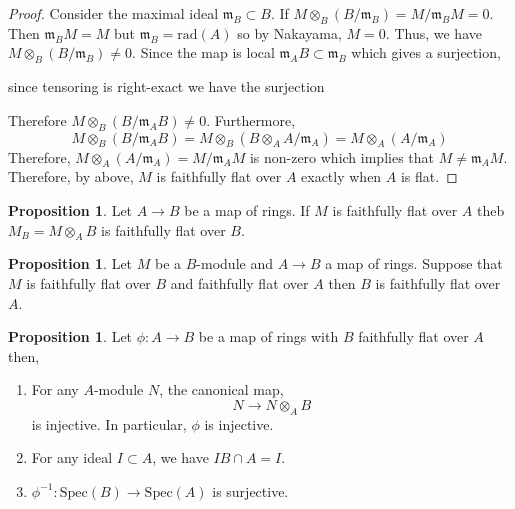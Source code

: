 \documentclass[12pt]{article}
\newcommand{\spec}[1]{\mathrm{Spec}\left( #1 \right)}
\newcommand{\rad}[1]{\mathrm{rad}\left( #1 \right)}
\newcommand{\m}{\mathfrak{m}}
\theoremstyle{remark}
\theoremstyle{definition}
\newtheorem{proposition}[theorem]{Proposition}
\begin{document}
\begin{proof}
Consider the maximal ideal $\m_B \subset B$. If $M \otimes_B (B / \m_B) = M / \m_B M = 0$. Then $\m_B M = M$ but $\m_B = \rad{A}$ so by Nakayama, $M = 0$. Thus, we have $M \otimes_B (B / \m_B) \neq 0$. Since the map is local $\m_A B \subset \m_B$ which gives a surjection,
\begin{center}
\end{center}
since tensoring is right-exact we have the surjection
\begin{center}
\end{center}
Therefore $M \otimes_B (B / \m_A B) \neq 0$. Furthermore, 
\[ M \otimes_B (B / \m_A B) = M \otimes_B (B \otimes_A A / \m_A) = M \otimes_A (A / \m_A) \] 
Therefore, $M \otimes_A (A / \m_A) = M / \m_A M$ is non-zero which implies that $M \neq \m_A M$. Therefore, by above, $M$ is faithfully flat over $A$ exactly when $A$ is flat.
\end{proof}

\begin{proposition}
Let $A \to B$ be a map of rings. If $M$ is faithfully flat over $A$ theb $M_B = M \otimes_A B$ is faithfully flat over $B$. 
\end{proposition}

\begin{proposition}
Let $M$ be a $B$-module and $A \to B$ a map of rings. Suppose that $M$ is faithfully flat over $B$ and faithfully flat over $A$ then $B$ is faithfully flat over $A$. 
\end{proposition}

\begin{proposition}
Let $\phi: A \to B$ be a map of rings with $B$ faithfully flat over $A$ then,
\begin{enumerate}
\item For any $A$-module $N$, the canonical map,
\[ N \to N \otimes_A B \]
is injective. In particular, $\phi$ is injective.
\item For any ideal $I \subset A$, we have $I B \cap A = I$.
\item $\phi^{-1} : \spec{B} \to \spec{A}$ is surjective. 
\end{enumerate} 
\end{proposition}
\end{document}
